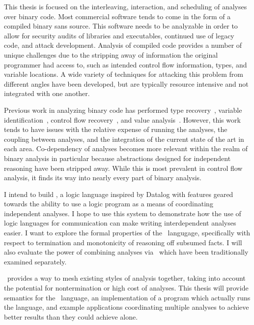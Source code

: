 This thesis is focused on the interleaving, interaction, and scheduling of analyses over binary code.
Most commercial software tends to come in the form of a compiled binary sans source.
This software needs to be analyzable in order to allow for security audits of libraries and executables, continued use of legacy code, and attack development.
Analysis of compiled code provides a number of unique challenges due to the stripping away of information the original programmer had access to, such as intended control flow information, types, and variable locations.
A wide variety of techniques for attacking this problem from different angles have been developed, but are typically resource intensive and not integrated with one another.

Previous work in analyzing binary code has performed type recovery~\cite{bitr}, variable identification~\cite{divine}, control flow recovery~\cite{jakstab,phoenix}, and value analysis~\cite{vsa}.
However, this work tends to have issues with the relative expense of running the analyses, the coupling between analyses, and the integration of the current state of the art in each area.
Co-dependency of analyses becomes more relevant within the realm of binary analysis in particular because abstractions designed for independent reasoning have been stripped away.
While this is most prevalent in control flow analysis, it finds its way into nearly every part of binary analysis.

I intend to build \sysname, a logic language inspired by Datalog with features geared towards the ability to use a logic program as a means of coordinating independent analyses.
I hope to use this system to demonstrate how the use of logic languages for communication can make writing interdependent analyses easier.
I want to explore the formal properties of the \sysname\ langugage, specifically with respect to termination and monotonicity of reasoning off subsumed facts.
I will also evaluate the power of combining analyses via \sysname\ which have been traditionally examined separately.

\sysname\ provides a way to mesh existing styles of analysis together, taking into account the potential for nontermination or high cost of analyses. This thesis will provide semantics for the \sysname\ language, an implementation of a program which actually runs the language, and example applications coordinating multiple analyses to achieve better results than they could achieve alone.

